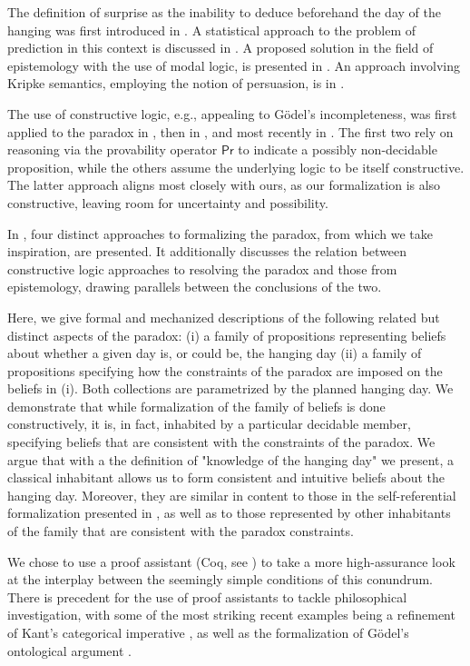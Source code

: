 \documentclass[runningheads]{llncs}
\begin{document}
The definition of surprise as the inability to deduce beforehand the day of the hanging
was first introduced in \cite{prediction}. A statistical approach to the problem
of prediction in this context is discussed in \cite{statistical}.
A proposed solution in the field of epistemology with the use of modal
logic, is presented in \cite{modalepistemic}. An approach involving
Kripke semantics, employing the notion of persuasion, is in \cite{kripkemodal}.

The use of constructive logic,
e.g., appealing to G\"{o}del's incompleteness, was first applied to the
paradox in \cite{goedelized}, then in \cite{godelinconsistent}, and most recently
in \cite{constructive} \cite{nonpredet}. The first two rely on reasoning via the provability operator $\mathsf{Pr}$ to indicate
a possibly non-decidable proposition, while the others assume the underlying logic to be itself
constructive. The latter approach aligns most closely with ours, as our formalization
is also constructive, leaving room for uncertainty and possibility.

In \cite{fourpossible}, four distinct approaches to formalizing the
paradox, from which we take inspiration, are presented. It additionally discusses the relation between
constructive logic approaches to resolving the paradox and those from epistemology, drawing parallels
between the conclusions of the two.

Here, we give formal and mechanized descriptions of the following
related but distinct aspects of the
paradox: (i) a family of propositions
representing beliefs about whether a given day is, or could be, the hanging day
(ii) a family of propositions specifying how the constraints of the
paradox are imposed on the beliefs in (i). Both collections are parametrized by
the planned hanging day. We demonstrate that while formalization of the
family of beliefs is done constructively, it is, in fact,
inhabited by a particular decidable member, specifying beliefs that are consistent with the constraints of the paradox. We argue that
with a the definition of "knowledge of the hanging day" we present,
a classical inhabitant allows us
to form consistent and intuitive beliefs about the hanging day.
Moreover, they are similar in content to those in the self-referential formalization presented
in \cite{godelinconsistent}, as well as to those represented by other inhabitants
of the family that are consistent with the paradox constraints.

We chose to use a proof
assistant (Coq, see \cite{coqmanual}) to take a more high-assurance look at the
interplay between the seemingly simple conditions of this conundrum.
There is precedent for the use of proof assistants to tackle philosophical
investigation, with some of the most striking recent examples
being a refinement of Kant's categorical imperative \cite{categoricalkant},
as well as the formalization of G\"{o}del's ontological argument \cite{ontological}.
\end{document}

